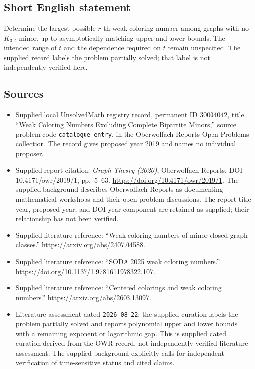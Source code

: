 \documentclass[11pt]{article}
\begin{document}
\subsection{Short English statement}
Determine the largest possible \(r\)-th weak coloring number among graphs with no \(K_{3,t}\) minor, up to asymptotically matching upper and lower bounds. The intended range of \(t\) and the dependence required on \(t\) remain unspecified. The supplied record labels the problem partially solved; that label is not independently verified here.
\subsection{Sources}
\begin{itemize}
\item Supplied local UnsolvedMath registry record, permanent ID \(30004042\), title ``Weak Coloring Numbers Excluding Complete Bipartite Minors,'' source problem code \texttt{catalogue entry}, in the Oberwolfach Reports Open Problems collection. The record gives proposed year 2019 and names no individual proposer.
\item Supplied report citation: \emph{Graph Theory (2020)}, Oberwolfach Reports, DOI 10.4171/owr/2019/1, pp.\ 5--63. \url{https://doi.org/10.4171/owr/2019/1}. The supplied background describes Oberwolfach Reports as documenting mathematical workshops and their open-problem discussions. The report title year, proposed year, and DOI year component are retained as supplied; their relationship has not been verified.
\item Supplied literature reference: ``Weak coloring numbers of minor-closed graph classes.'' \url{https://arxiv.org/abs/2407.04588}.
\item Supplied literature reference: ``SODA 2025 weak coloring numbers.'' \url{https://doi.org/10.1137/1.9781611978322.107}.
\item Supplied literature reference: ``Centered colorings and weak coloring numbers.'' \url{https://arxiv.org/abs/2603.13097}.
\item Literature assessment dated \texttt{2026-08-22}: the supplied curation labels the problem partially solved and reports polynomial upper and lower bounds with a remaining exponent or logarithmic gap. This is supplied dated curation derived from the OWR record, not independently verified literature assessment. The supplied background explicitly calls for independent verification of time-sensitive status and cited claims.
\end{itemize}
\end{document}

